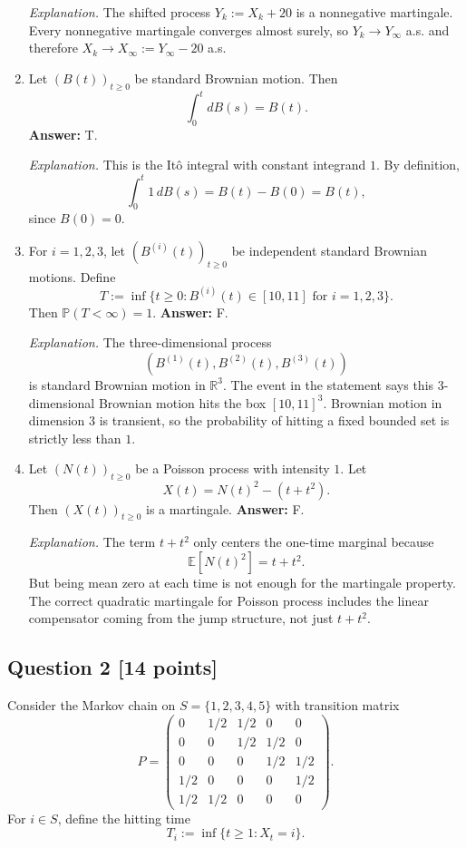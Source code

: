 \documentclass[11pt]{article}
\theoremstyle{definition}
\begin{document}
\begin{enumerate}[label=(\arabic*)]
    \emph{Explanation.} The shifted process $Y_k:=X_k+20$ is a nonnegative martingale. Every nonnegative martingale converges almost surely, so $Y_k\to Y_\infty$ a.s. and therefore $X_k\to X_\infty:=Y_\infty-20$ a.s.

    \item Let $(B(t))_{t\ge 0}$ be standard Brownian motion. Then
    \[
    \int_0^t dB(s)=B(t).
    \]
    \textbf{Answer:} T.

    \emph{Explanation.} This is the It\^o integral with constant integrand $1$. By definition,
    \[
    \int_0^t 1\,dB(s)=B(t)-B(0)=B(t),
    \]
    since $B(0)=0$.

    \item For $i=1,2,3$, let $(B^{(i)}(t))_{t\ge 0}$ be independent standard Brownian motions. Define
    \[
    T:=\inf\{t\ge 0: B^{(i)}(t)\in[10,11] \text{ for } i=1,2,3\}.
    \]
    Then $\mathbb P(T<\infty)=1$.
    \textbf{Answer:} F.

    \emph{Explanation.} The three-dimensional process
    \[
    (B^{(1)}(t),B^{(2)}(t),B^{(3)}(t))
    \]
    is standard Brownian motion in $\mathbb R^3$. The event in the statement says this $3$-dimensional Brownian motion hits the box $[10,11]^3$. Brownian motion in dimension $3$ is transient, so the probability of hitting a fixed bounded set is strictly less than $1$.

    \item Let $(N(t))_{t\ge 0}$ be a Poisson process with intensity $1$. Let
    \[
    X(t)=N(t)^2-(t+t^2).
    \]
    Then $(X(t))_{t\ge 0}$ is a martingale.
    \textbf{Answer:} F.

    \emph{Explanation.} The term $t+t^2$ only centers the one-time marginal because
    \[
    \mathbb E[N(t)^2]=t+t^2.
    \]
    But being mean zero at each time is not enough for the martingale property. The correct quadratic martingale for Poisson process includes the linear compensator coming from the jump structure, not just $t+t^2$.
\end{enumerate}

\subsection*{Question 2 \hfill [14 points]}
Consider the Markov chain on $S=\{1,2,3,4,5\}$ with transition matrix
\[
P=
\begin{pmatrix}
0 & 1/2 & 1/2 & 0 & 0\\
0 & 0 & 1/2 & 1/2 & 0\\
0 & 0 & 0 & 1/2 & 1/2\\
1/2 & 0 & 0 & 0 & 1/2\\
1/2 & 1/2 & 0 & 0 & 0
\end{pmatrix}.
\]
For $i\in S$, define the hitting time
\[
T_i:=\inf\{t\ge 1: X_t=i\}.
\]
\end{document}
